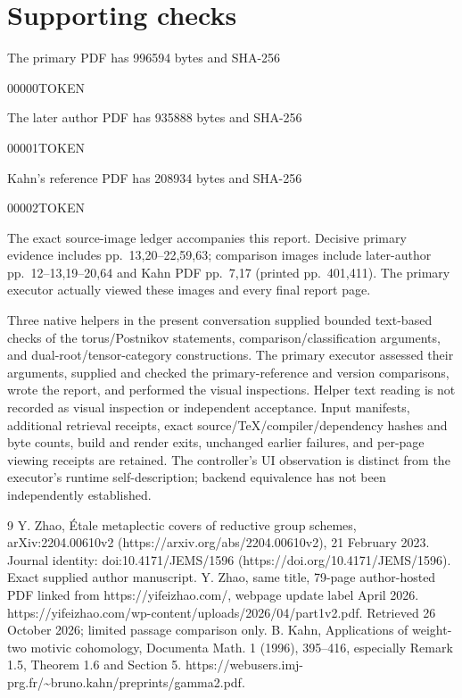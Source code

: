 \documentclass[10pt]{article}
\begin{document}
\section*{Supporting checks}
The primary PDF has 996594 bytes and SHA-256\par
00000TOKEN\par
The later author PDF has 935888 bytes and SHA-256\par
00001TOKEN\par
Kahn’s reference PDF has 208934 bytes and SHA-256\par
00002TOKEN\par
The exact source-image ledger accompanies this report. Decisive primary evidence includes pp. 13,20–22,59,63; comparison images include later-author pp. 12–13,19–20,64 and Kahn PDF pp. 7,17 (printed pp. 401,411). The primary executor actually viewed these images and every final report page.\par
Three native helpers in the present conversation supplied bounded text-based checks of the torus/Postnikov statements, comparison/classification arguments, and dual-root/tensor-category constructions. The primary executor assessed their arguments, supplied and checked the primary-reference and version comparisons, wrote the report, and performed the visual inspections. Helper text reading is not recorded as visual inspection or independent acceptance. Input manifests, additional retrieval receipts, exact source/TeX/compiler/dependency hashes and byte counts, build and render exits, unchanged earlier failures, and per-page viewing receipts are retained. The controller’s UI observation is distinct from the executor’s runtime self-description; backend equivalence has not been independently established.\par
9 Y. Zhao, Étale metaplectic covers of reductive group schemes, arXiv:2204.00610v2 (https://arxiv.org/abs/2204.00610v2), 21 February 2023. Journal identity: doi:10.4171/JEMS/1596 (https://doi.org/10.4171/JEMS/1596). Exact supplied author manuscript. Y. Zhao, same title, 79-page author-hosted PDF linked from https://yifeizhao.com/, webpage update label April 2026. https://yifeizhao.com/wp-content/uploads/2026/04/part1v2.pdf. Retrieved 26 October 2026; limited passage comparison only. B. Kahn, Applications of weight-two motivic cohomology, Documenta Math. 1 (1996), 395–416, especially Remark 1.5, Theorem 1.6 and Section 5. https://webusers.imj-prg.fr/\textasciitilde{}bruno.kahn/preprints/gamma2.pdf.\par
\end{document}
